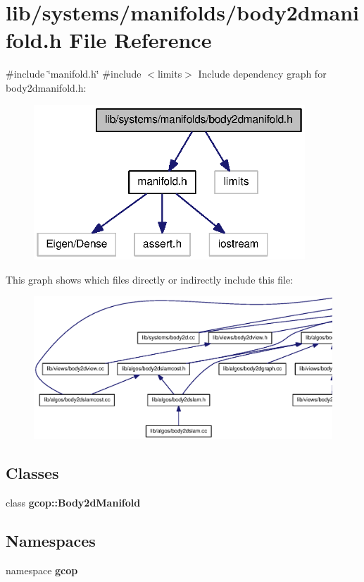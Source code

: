 \section{lib/systems/manifolds/body2dmanifold.h \-File \-Reference}
\label{body2dmanifold_8h}
{\ttfamily \#include \char`\"{}manifold.\-h\char`\"{}}\*
{\ttfamily \#include $<$limits$>$}\*
\-Include dependency graph for body2dmanifold.\-h\-:
\nopagebreak
\begin{figure}[H]
\begin{center}
\leavevmode
\includegraphics[width=289pt]{body2dmanifold_8h__incl}
\end{center}
\end{figure}
\-This graph shows which files directly or indirectly include this file\-:
\nopagebreak
\begin{figure}[H]
\begin{center}
\leavevmode
\includegraphics[width=350pt]{body2dmanifold_8h__dep__incl}
\end{center}
\end{figure}
\subsection*{\-Classes}
\begin{DoxyCompactItemize}
\item 
class {\bf gcop\-::\-Body2d\-Manifold}
\end{DoxyCompactItemize}
\subsection*{\-Namespaces}
\begin{DoxyCompactItemize}
\item 
namespace {\bf gcop}
\end{DoxyCompactItemize}
